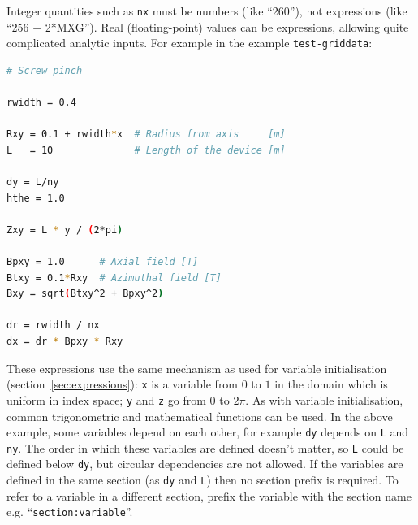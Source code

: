 \documentclass[12pt]{article}
\begin{document}
Integer quantities such as \texttt{nx} must be numbers (like ``260''), not
expressions (like ``256 + 2*MXG'').  Real (floating-point) values can be
expressions, allowing quite complicated analytic inputs.  For example in the
example \texttt{test-griddata}:
%
\begin{lstlisting}[language=bash,numbers=none]
# Screw pinch

rwidth = 0.4

Rxy = 0.1 + rwidth*x  # Radius from axis     [m]
L   = 10              # Length of the device [m]

dy = L/ny
hthe = 1.0

Zxy = L * y / (2*pi)

Bpxy = 1.0      # Axial field [T]
Btxy = 0.1*Rxy  # Azimuthal field [T]
Bxy = sqrt(Btxy^2 + Bpxy^2)

dr = rwidth / nx
dx = dr * Bpxy * Rxy
\end{lstlisting}
%
%
%
%
These expressions use the same mechanism as used for variable initialisation
(section~\ref{sec:expressions}): \texttt{x} is a variable from $0$ to $1$ in
the domain which is uniform in index space; \texttt{y} and \texttt{z} go from
$0$ to $2\pi$. As with variable initialisation, common trigonometric and
mathematical functions can be used.  In the above example, some variables
depend on each other, for example \texttt{dy} depends on \texttt{L} and
\texttt{ny}. The order in which these variables are defined doesn't matter, so
\texttt{L} could be defined below \texttt{dy}, but circular dependencies are
not allowed. If the variables are defined in the same section (as \texttt{dy}
and \texttt{L}) then no section prefix is required. To refer to a variable in a
different section, prefix the variable with the section name e.g.
``\texttt{section:variable}''.
\end{document}
